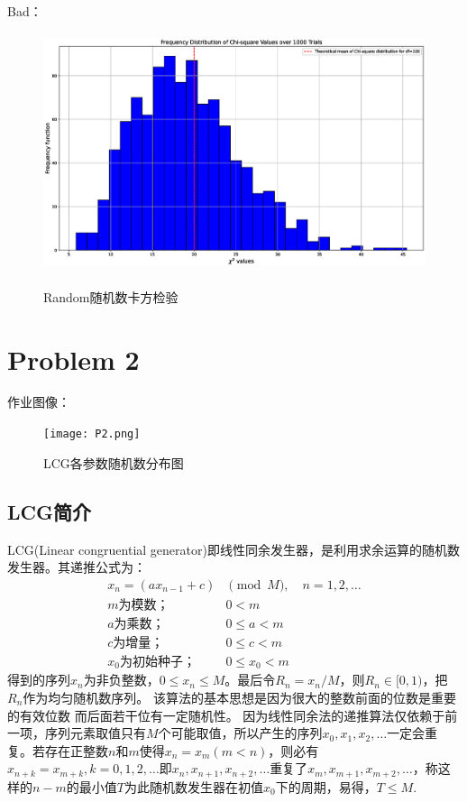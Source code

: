 \documentclass[12pt,a4paper]{article}%
\begin{document}
    Bad：
    \begin{figure}[htbp]
        \centering
        \includegraphics[height=7cm]{1.eps}\label{fig:figure4}
        \caption{Random随机数卡方检验}
    \end{figure}

    \section{Problem 2}
    作业图像：
    \begin{figure}[htbp]
        \centering
        \texttt{[image: P2.png]}\label{fig:figure4}
        \caption{LCG各参数随机数分布图}
    \end{figure}

    \subsection{LCG简介}
    LCG(Linear congruential generator)即线性同余发生器，是利用求余运算的随机数发生器。其递推公式为：
    \begin{equation}
        \begin{split}
            x_n = (ax_{n-1}+c) & \pmod{M}, \quad n=1,2,\ldots \\
            m\text{为模数；} & 0<m \\
            a\text{为乘数；} & 0\leq a < m \\
            c\text{为增量；} & 0\leq c < m \\
            x_{0}\text{为初始种子；} & 0\leq x_0 <m
        \end{split}\label{eq:equation}
    \end{equation}
    得到的序列${x_n}$为非负整数，$0\leq x_n \leq M$。最后令$R_n=x_n/M$，则$R_n\in [0,1)$，把${R_n}$作为均匀随机数序列。
    该算法的基本思想是因为很大的整数前面的位数是重要的有效位数 而后面若干位有一定随机性。
    因为线性同余法的递推算法仅依赖于前一项，序列元素取值只有$M$个可能取值，所以产生的序列$x_0,x_1,x_2,\ldots$一定会重复。若存在正整数$n$和$m$使得$x_n=x_m(m<n)$，则必有
    $x_{n+k}=x_{m+k},k=0,1,2,\ldots$即$x_n,x_{n+1},x_{n+2},\ldots$重复了$x_m,x_{m+1},x_{m+2},\ldots$，称这样的$n-m$的最小值$T$为此随机数发生器在初值$x_0$下的周期，易得，$T\leq M$.
\end{document}
